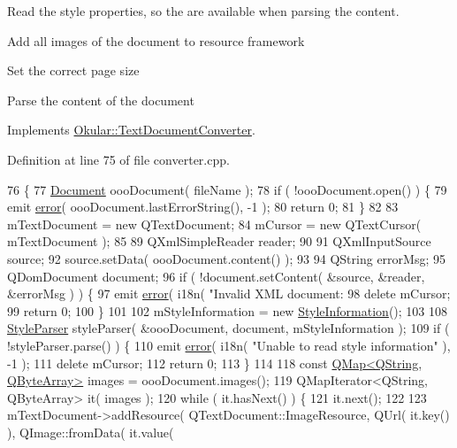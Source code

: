 Read the style properties, so the are available when parsing the content.

Add all images of the document to resource framework

Set the correct page size

Parse the content of the document

Implements \hyperlink{classOkular_1_1TextDocumentConverter_ad05f8bcde0f347c6292968fab331bcef}{Okular\+::\+Text\+Document\+Converter}.



Definition at line 75 of file converter.\+cpp.


\begin{DoxyCode}
76 \{
77   \hyperlink{classOOO_1_1Document}{Document} oooDocument( fileName );
78   \textcolor{keywordflow}{if} ( !oooDocument.open() ) \{
79     emit \hyperlink{classOkular_1_1TextDocumentConverter_a93f1335bdd8232626364c973d9d7e6b4}{error}( oooDocument.lastErrorString(), -1 );
80     \textcolor{keywordflow}{return} 0;
81   \}
82 
83   mTextDocument = \textcolor{keyword}{new} QTextDocument;
84   mCursor = \textcolor{keyword}{new} QTextCursor( mTextDocument );
85 
89   QXmlSimpleReader reader;
90 
91   QXmlInputSource source;
92   source.setData( oooDocument.content() );
93 
94   QString errorMsg;
95   QDomDocument document;
96   \textcolor{keywordflow}{if} ( !document.setContent( &source, &reader, &errorMsg ) ) \{
97     emit \hyperlink{classOkular_1_1TextDocumentConverter_a93f1335bdd8232626364c973d9d7e6b4}{error}( i18n( \textcolor{stringliteral}{"Invalid XML document: %
98     \textcolor{keyword}{delete} mCursor;
99     \textcolor{keywordflow}{return} 0;
100   \}
101 
102   mStyleInformation = \textcolor{keyword}{new} \hyperlink{classOOO_1_1StyleInformation}{StyleInformation}();
103 
108   \hyperlink{classOOO_1_1StyleParser}{StyleParser} styleParser( &oooDocument, document, mStyleInformation );
109   \textcolor{keywordflow}{if} ( !styleParser.parse() ) \{
110     emit \hyperlink{classOkular_1_1TextDocumentConverter_a93f1335bdd8232626364c973d9d7e6b4}{error}( i18n( \textcolor{stringliteral}{"Unable to read style information"} ), -1 );
111     \textcolor{keyword}{delete} mCursor;
112     \textcolor{keywordflow}{return} 0;
113   \}
114 
118   \textcolor{keyword}{const} \hyperlink{classQMap}{QMap<QString, QByteArray>} images = oooDocument.images();
119   QMapIterator<QString, QByteArray> it( images );
120   \textcolor{keywordflow}{while} ( it.hasNext() ) \{
121     it.next();
122 
123     mTextDocument->addResource( QTextDocument::ImageResource, QUrl( it.key() ), QImage::fromData( it.value(
}
\end{DoxyCode}
